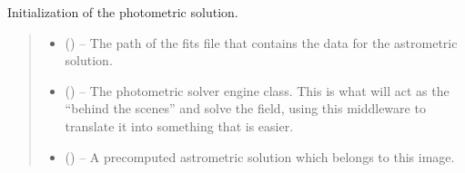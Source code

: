 \documentclass[letterpaper,11pt,english]{sphinxmanual}
\begin{document}
\begin{savenotes}
\begin{fulllineitems}
\begin{savenotes}\begin{fulllineitems}
\label{\detokenize{code/opihiexarata.photometry.solution:opihiexarata.photometry.solution.PhotometricSolution.__init__}}
\pysigstartsignatures
{}
\pysigstopsignatures
\sphinxAtStartPar
Initialization of the photometric solution.
\begin{quote}\begin{description}
\begin{itemize}
\item {} 
\sphinxAtStartPar
{} () – The path of the fits file that contains the data for the astrometric
solution.

\item {} 
\sphinxAtStartPar
{} ({\hyperref[\detokenize{code/opihiexarata.library.engine:opihiexarata.library.engine.PhotometryEngine}]{}}) – The photometric solver engine class. This is what will act as the
“behind the scenes” and solve the field, using this middleware to
translate it into something that is easier.

\item {} 
\sphinxAtStartPar
{} ({\hyperref[\detokenize{code/opihiexarata.astrometry.solution:opihiexarata.astrometry.solution.AstrometricSolution}]{}}\sphinxstyleliteralemphasis{\sphinxupquote{, }}) – A precomputed astrometric solution which belongs to this image.


\end{itemize}
\end{description}
\end{quote}
\end{fulllineitems}
\end{savenotes}
\end{fulllineitems}
\end{savenotes}
\end{document}
